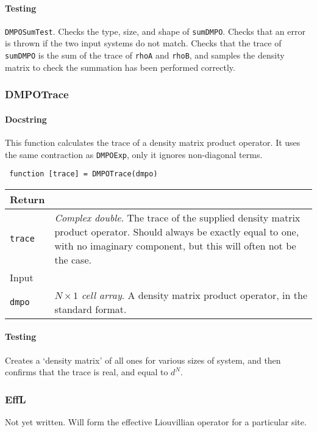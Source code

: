  \paragraph{Testing} \lstinline$DMPOSumTest$. Checks the type, size, and shape of \lstinline$sumDMPO$. Checks that an error is thrown if the two input systems do not match. Checks that the trace of \lstinline$sumDMPO$ is the sum of the trace of \lstinline$rhoA$ and \lstinline$rhoB$, and samples the density matrix to check the summation has been performed correctly. 
 
 \subsubsection{DMPOTrace}
 \paragraph{Docstring} This function calculates the trace of a density matrix product operator. It uses the same contraction as \lstinline$DMPOExp$, only it ignores non-diagonal terms. 
 \begin{lstlisting}
 function [trace] = DMPOTrace(dmpo) \end{lstlisting}
 \begin{longtabu}{X[1,l]X[4,l]}
 \hline
 Return & \\ \hline
 \lstinline$trace$ & \emph{Complex double}. The trace of the supplied density matrix product operator. Should always be exactly equal to one, with no imaginary component, but this will often not be the case. \\ \hline
 Input & \\ \hline
 \lstinline$dmpo$ & \emph{\(N \times 1\) cell array}. A density matrix product operator, in the standard format. \\
 \hline
 \end{longtabu}
 \paragraph{Testing} Creates a `density matrix' of all ones for various sizes of system, and then confirms that the trace is real, and equal to \(d^{N}\). 
 
 \subsubsection{EffL}
 Not yet written. Will form the effective Liouvillian operator for a particular site.
 
